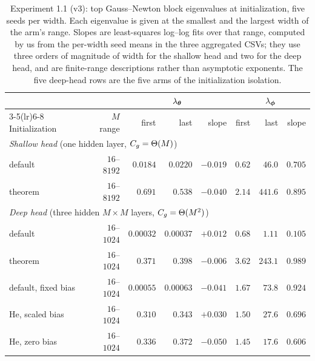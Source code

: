\begin{table}[htbp]
\centering
\small
\setlength{\tabcolsep}{4pt}
\caption{Experiment 1.1 (v3): top Gauss--Newton block eigenvalues at
initialization, five seeds per width. Each eigenvalue is given at the smallest
and the largest width of the arm's range. Slopes are least-squares log--log
fits over that range, computed by us from the per-width seed means in the three
aggregated CSVs; they use three orders of magnitude of width for the shallow
head and two for the deep head, and are finite-range descriptions rather than
asymptotic exponents. The five deep-head rows are the five arms of the
initialization isolation.}
\label{tab:app_exp11}
\begin{tabular}{lrrrrrrr}
\toprule
& & \multicolumn{3}{c}{$\lambda_{\boldsymbol{\theta}}$} & \multicolumn{3}{c}{$\lambda_{\boldsymbol{\phi}}$} \\
\cmidrule(lr){3-5}\cmidrule(lr){6-8}
Initialization & $M$ range & first & last & slope & first & last & slope \\
\midrule
\multicolumn{8}{l}{\emph{Shallow head} (one hidden layer, $C_g = \Theta(M)$)} \\
default & $16$--$8192$ & $0.0184$ & $0.0220$ & $-0.019$ & $0.62$ & $46.0$ & $0.705$ \\
theorem & $16$--$8192$ & $0.691$ & $0.538$ & $-0.040$ & $2.14$ & $441.6$ & $0.895$ \\
\midrule
\multicolumn{8}{l}{\emph{Deep head} (three hidden $M\times M$ layers, $C_g = \Theta(M^2)$)} \\
default & $16$--$1024$ & $0.00032$ & $0.00037$ & $+0.012$ & $0.68$ & $1.11$ & $0.105$ \\
theorem & $16$--$1024$ & $0.371$ & $0.398$ & $-0.006$ & $3.62$ & $243.1$ & $0.989$ \\
default, fixed bias & $16$--$1024$ & $0.00055$ & $0.00063$ & $-0.041$ & $1.67$ & $73.8$ & $0.924$ \\
He, scaled bias & $16$--$1024$ & $0.310$ & $0.343$ & $+0.030$ & $1.50$ & $27.6$ & $0.696$ \\
He, zero bias & $16$--$1024$ & $0.336$ & $0.372$ & $-0.050$ & $1.45$ & $17.6$ & $0.606$ \\
\bottomrule
\end{tabular}
\end{table}

